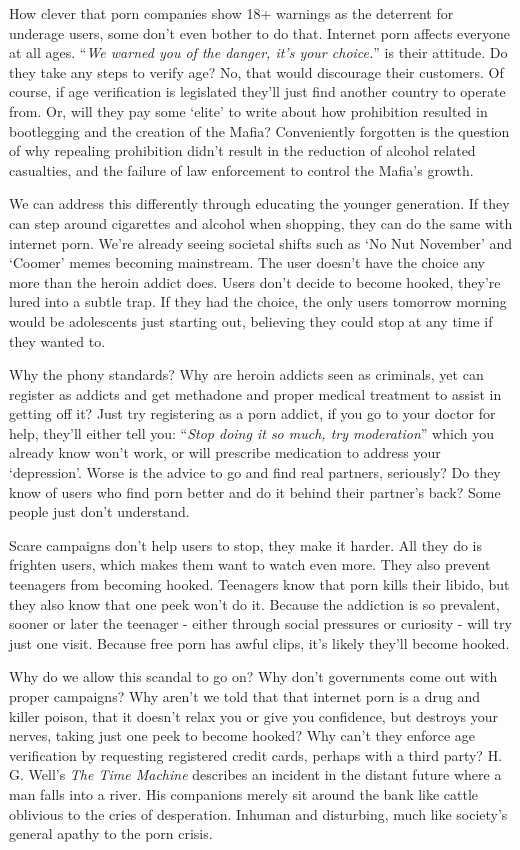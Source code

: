\documentclass[
]{book}
\begin{document}
How clever that porn companies show 18+ warnings as the deterrent for underage users, some don't even bother to do that. Internet porn affects everyone at all ages. ``\emph{We warned you of the danger, it's your choice.}'' is their attitude. Do they take any steps to verify age? No, that would discourage their customers. Of course, if age verification is legislated they'll just find another country to operate from. Or, will they pay some `elite' to write about how prohibition resulted in bootlegging and the creation of the Mafia? Conveniently forgotten is the question of why repealing prohibition didn't result in the reduction of alcohol related casualties, and the failure of law enforcement to control the Mafia's growth.

We can address this differently through educating the younger generation. If they can step around cigarettes and alcohol when shopping, they can do the same with internet porn. We're already seeing societal shifts such as `No Nut November' and `Coomer' memes becoming mainstream. The user doesn't have the choice any more than the heroin addict does. Users don't decide to become hooked, they're lured into a subtle trap. If they had the choice, the only users tomorrow morning would be adolescents just starting out, believing they could stop at any time if they wanted to.

Why the phony standards? Why are heroin addicts seen as criminals, yet can register as addicts and get methadone and proper medical treatment to assist in getting off it? Just try registering as a porn addict, if you go to your doctor for help, they'll either tell you: ``\emph{Stop doing it so much, try moderation}'' which you already know won't work, or will prescribe medication to address your `depression'. Worse is the advice to go and find real partners, seriously? Do they know of users who find porn better and do it behind their partner's back? Some people just don't understand.

Scare campaigns don't help users to stop, they make it harder. All they do is frighten users, which makes them want to watch even more. They also prevent teenagers from becoming hooked. Teenagers know that porn kills their libido, but they also know that one peek won't do it. Because the addiction is so prevalent, sooner or later the teenager - either through social pressures or curiosity - will try just one visit. Because free porn has awful clips, it's likely they'll become hooked.

Why do we allow this scandal to go on? Why don't governments come out with proper campaigns? Why aren't we told that that internet porn is a drug and killer poison, that it doesn't relax you or give you confidence, but destroys your nerves, taking just one peek to become hooked? Why can't they enforce age verification by requesting registered credit cards, perhaps with a third party? H. G. Well's \emph{The Time Machine} describes an incident in the distant future where a man falls into a river. His companions merely sit around the bank like cattle oblivious to the cries of desperation. Inhuman and disturbing, much like society's general apathy to the porn crisis.
\end{document}
